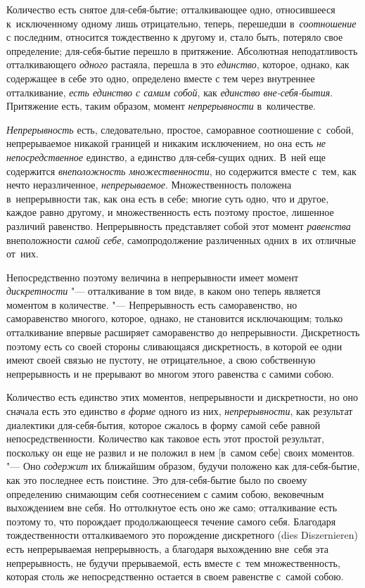 

Количество есть снятое для-себя-бытие; отталкивающее одно, относившееся
к~исключенному одному лишь отрицательно, теперь, перешедши в~{\em соотношение}
с последним, относится тождественно к другому и, стало быть, потеряло свое
определение; для-себя-бытие перешло в притяжение. Абсолютная неподатливость
отталкивающего {\em одного} растаяла, перешла в это {\em единство}, которое,
однако, как содержащее в себе это одно, определено вместе с тем через
внутреннее отталкивание, {\em есть единство с самим собой}, как
{\em единство вне-себя-бытия}. Притяжение есть, таким образом, момент
{\em непрерывности} в~количестве.

{\em Непрерывность} есть, следовательно, простое, саморавное соотношение
с~собой, непрерываемое никакой границей и никаким исключением, но она есть
{\em не непосредственное} единство, а единство для-себя-сущих одних. В~ней
еще содержится {\em внеположность множественности}, но содержится вместе
с~тем, как нечто неразличенное, {\em непрерываемое}. Множественность положена
в~непрерывности так, как она есть в себе; многие суть одно, что и другое,
каждое равно другому, и множественность есть поэтому простое, лишенное
различий равенство. Непрерывность представляет собой этот момент
{\em равенства} внеположности {\em самой себе}, самопродолжение различенных
одних в~их отличные от~них.

Непосредственно поэтому величина в непрерывности имеет момент
{\em дискретности} "--- отталкивание в том виде, в каком оно теперь является
моментом в количестве. "--- Непрерывность есть саморавенство, но саморавенство
многого, которое, однако, не становится исключающим; только отталкивание
впервые расширяет саморавенство до непрерывности. Дискретность поэтому есть
со своей стороны сливающаяся дискретность, в которой ее одни имеют своей связью
не пустоту, не отрицательное, а свою собственную непрерывность и не прерывают
во многом этого равенства с самими собою.

Количество есть единство этих моментов, непрерывности и дискретности, но оно
сначала есть это единство {\em в форме} одного из них, {\em непрерывности}, как
результат диалектики для-себя-бытия, которое сжалось в форму самой себе равной
непосредственности. Количество как таковое есть этот простой результат,
поскольку он еще не развил и не положил в нем [в~самом себе] своих моментов.
"--- Оно {\em содержит} их ближайшим образом, будучи положено как
для-себя-бытие, как это последнее есть поистине. Это для-себя-бытие было по
своему определению снимающим себя соотнесением с самим собою, вековечным
выхождением вне себя. Но оттолкнутое есть оно же само; отталкивание есть
поэтому то, что порождает продолжающееся течение самого себя. Благодаря
тождественности отталкиваемого это порождение дискретного (dies
Dis\-zer\-nie\-ren) есть непрерываемая непрерывность, а благодаря выхождению
вне~себя эта непрерывность, не будучи прерываемой, есть вместе с~тем
множественность, которая столь же непосредственно остается в своем равенстве
с~самой собою.


